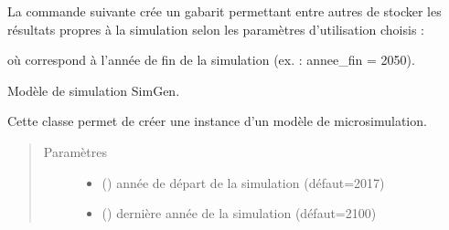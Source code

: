 \documentclass[letterpaper,10pt,french]{sphinxmanual}
\begin{document}
\begin{DUlineblock}{0em}
\item[] 
\end{DUlineblock}


La commande suivante crée un gabarit permettant entre autres de stocker les résultats propres à la simulation selon les paramètres d’utilisation choisis :

\begin{sphinxVerbatim}[commandchars=\\\{\}]
  
\end{sphinxVerbatim}

où  correspond à l’année de fin de la simulation (ex. : annee\_fin = 2050).


\begin{fulllineitems}
\label{\detokenize{utilisation:simgen.model}}
Modèle de simulation SimGen.

Cette classe permet de créer une instance d’un modèle de microsimulation.
\begin{quote}\begin{description}
\item[{Paramètres}] \leavevmode\begin{itemize}
\item {} 
 () \textendash{} année de départ de la simulation (défaut=2017)

\item {} 
 () \textendash{} dernière année de la simulation (défaut=2100)

\end{itemize}

\end{description}\end{quote}

\end{fulllineitems}
\end{document}
